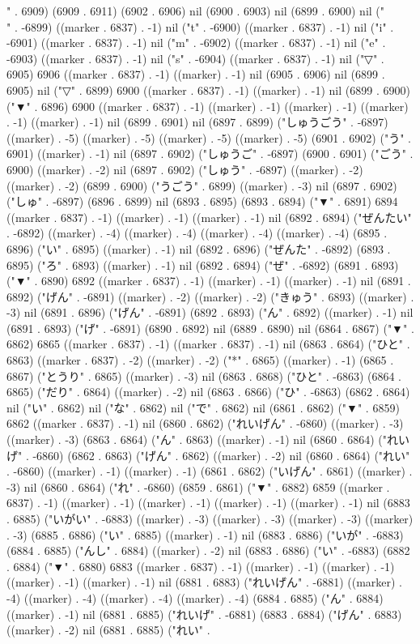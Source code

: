 " . 6909) (6909 . 6911) (6902 . 6906) nil (6900 . 6903) nil (6899 . 6900) nil ("\\" . -6899) ((marker . 6837) . -1) nil ("t" . -6900) ((marker . 6837) . -1) nil ("i" . -6901) ((marker . 6837) . -1) nil ("m" . -6902) ((marker . 6837) . -1) nil ("e" . -6903) ((marker . 6837) . -1) nil ("s" . -6904) ((marker . 6837) . -1) nil ("▽" . 6905) 6906 ((marker . 6837) . -1) ((marker) . -1) nil (6905 . 6906) nil (6899 . 6905) nil ("▽" . 6899) 6900 ((marker . 6837) . -1) ((marker) . -1) nil (6899 . 6900) ("▼" . 6896) 6900 ((marker . 6837) . -1) ((marker) . -1) ((marker) . -1) ((marker) . -1) ((marker) . -1) nil (6899 . 6901) nil (6897 . 6899) ("しゅうごう" . -6897) ((marker) . -5) ((marker) . -5) ((marker) . -5) ((marker) . -5) (6901 . 6902) ("う" . 6901) ((marker) . -1) nil (6897 . 6902) ("しゅうご" . -6897) (6900 . 6901) ("ごう" . 6900) ((marker) . -2) nil (6897 . 6902) ("しゅう" . -6897) ((marker) . -2) ((marker) . -2) (6899 . 6900) ("うごう" . 6899) ((marker) . -3) nil (6897 . 6902) ("しゅ" . -6897) (6896 . 6899) nil (6893 . 6895) (6893 . 6894) ("▼" . 6891) 6894 ((marker . 6837) . -1) ((marker) . -1) ((marker) . -1) nil (6892 . 6894) ("ぜんたい" . -6892) ((marker) . -4) ((marker) . -4) ((marker) . -4) ((marker) . -4) (6895 . 6896) ("い" . 6895) ((marker) . -1) nil (6892 . 6896) ("ぜんた" . -6892) (6893 . 6895) ("ろ" . 6893) ((marker) . -1) nil (6892 . 6894) ("ぜ" . -6892) (6891 . 6893) ("▼" . 6890) 6892 ((marker . 6837) . -1) ((marker) . -1) ((marker) . -1) nil (6891 . 6892) ("げん" . -6891) ((marker) . -2) ((marker) . -2) ("きゅう" . 6893) ((marker) . -3) nil (6891 . 6896) ("げん" . -6891) (6892 . 6893) ("ん" . 6892) ((marker) . -1) nil (6891 . 6893) ("げ" . -6891) (6890 . 6892) nil (6889 . 6890) nil (6864 . 6867) ("▼" . 6862) 6865 ((marker . 6837) . -1) ((marker . 6837) . -1) nil (6863 . 6864) ("ひと" . 6863) ((marker . 6837) . -2) ((marker) . -2) ("*" . 6865) ((marker) . -1) (6865 . 6867) ("とうり" . 6865) ((marker) . -3) nil (6863 . 6868) ("ひと" . -6863) (6864 . 6865) ("だり" . 6864) ((marker) . -2) nil (6863 . 6866) ("ひ" . -6863) (6862 . 6864) nil ("い" . 6862) nil ("な" . 6862) nil ("で" . 6862) nil (6861 . 6862) ("▼" . 6859) 6862 ((marker . 6837) . -1) nil (6860 . 6862) ("れいげん" . -6860) ((marker) . -3) ((marker) . -3) (6863 . 6864) ("ん" . 6863) ((marker) . -1) nil (6860 . 6864) ("れいげ" . -6860) (6862 . 6863) ("げん" . 6862) ((marker) . -2) nil (6860 . 6864) ("れい" . -6860) ((marker) . -1) ((marker) . -1) (6861 . 6862) ("いげん" . 6861) ((marker) . -3) nil (6860 . 6864) ("れ" . -6860) (6859 . 6861) ("▼" . 6882) 6859 ((marker . 6837) . -1) ((marker) . -1) ((marker) . -1) ((marker) . -1) ((marker) . -1) nil (6883 . 6885) ("いがい" . -6883) ((marker) . -3) ((marker) . -3) ((marker) . -3) ((marker) . -3) (6885 . 6886) ("い" . 6885) ((marker) . -1) nil (6883 . 6886) ("いが" . -6883) (6884 . 6885) ("んし" . 6884) ((marker) . -2) nil (6883 . 6886) ("い" . -6883) (6882 . 6884) ("▼" . 6880) 6883 ((marker . 6837) . -1) ((marker) . -1) ((marker) . -1) ((marker) . -1) ((marker) . -1) nil (6881 . 6883) ("れいげん" . -6881) ((marker) . -4) ((marker) . -4) ((marker) . -4) ((marker) . -4) (6884 . 6885) ("ん" . 6884) ((marker) . -1) nil (6881 . 6885) ("れいげ" . -6881) (6883 . 6884) ("げん" . 6883) ((marker) . -2) nil (6881 . 6885) ("れい" . 